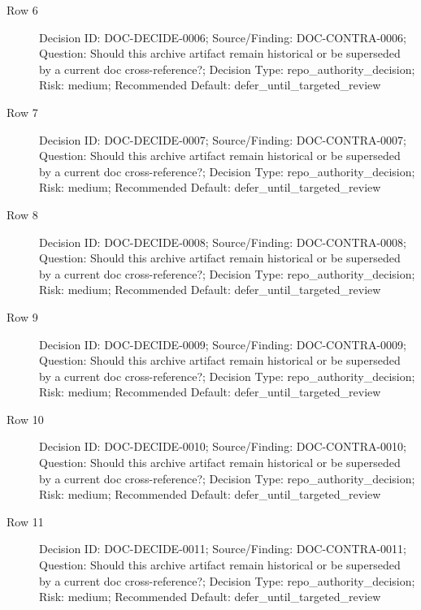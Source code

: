 \documentclass[9pt,a4paper,openany]{book}
\begin{document}
\begin{description}
\item[Row 6] Decision ID: DOC-\allowbreak{}DECIDE-\allowbreak{}0006; Source/\allowbreak{}Finding: DOC-\allowbreak{}CONTRA-\allowbreak{}0006; Question: Should this archive artifact remain historical or be superseded by a current doc cross-\allowbreak{}reference?; Decision Type: repo\_\allowbreak{}authority\_\allowbreak{}decision; Risk: medium; Recommended Default: defer\_\allowbreak{}until\_\allowbreak{}targeted\_\allowbreak{}review
\item[Row 7] Decision ID: DOC-\allowbreak{}DECIDE-\allowbreak{}0007; Source/\allowbreak{}Finding: DOC-\allowbreak{}CONTRA-\allowbreak{}0007; Question: Should this archive artifact remain historical or be superseded by a current doc cross-\allowbreak{}reference?; Decision Type: repo\_\allowbreak{}authority\_\allowbreak{}decision; Risk: medium; Recommended Default: defer\_\allowbreak{}until\_\allowbreak{}targeted\_\allowbreak{}review
\item[Row 8] Decision ID: DOC-\allowbreak{}DECIDE-\allowbreak{}0008; Source/\allowbreak{}Finding: DOC-\allowbreak{}CONTRA-\allowbreak{}0008; Question: Should this archive artifact remain historical or be superseded by a current doc cross-\allowbreak{}reference?; Decision Type: repo\_\allowbreak{}authority\_\allowbreak{}decision; Risk: medium; Recommended Default: defer\_\allowbreak{}until\_\allowbreak{}targeted\_\allowbreak{}review
\item[Row 9] Decision ID: DOC-\allowbreak{}DECIDE-\allowbreak{}0009; Source/\allowbreak{}Finding: DOC-\allowbreak{}CONTRA-\allowbreak{}0009; Question: Should this archive artifact remain historical or be superseded by a current doc cross-\allowbreak{}reference?; Decision Type: repo\_\allowbreak{}authority\_\allowbreak{}decision; Risk: medium; Recommended Default: defer\_\allowbreak{}until\_\allowbreak{}targeted\_\allowbreak{}review
\item[Row 10] Decision ID: DOC-\allowbreak{}DECIDE-\allowbreak{}0010; Source/\allowbreak{}Finding: DOC-\allowbreak{}CONTRA-\allowbreak{}0010; Question: Should this archive artifact remain historical or be superseded by a current doc cross-\allowbreak{}reference?; Decision Type: repo\_\allowbreak{}authority\_\allowbreak{}decision; Risk: medium; Recommended Default: defer\_\allowbreak{}until\_\allowbreak{}targeted\_\allowbreak{}review
\item[Row 11] Decision ID: DOC-\allowbreak{}DECIDE-\allowbreak{}0011; Source/\allowbreak{}Finding: DOC-\allowbreak{}CONTRA-\allowbreak{}0011; Question: Should this archive artifact remain historical or be superseded by a current doc cross-\allowbreak{}reference?; Decision Type: repo\_\allowbreak{}authority\_\allowbreak{}decision; Risk: medium; Recommended Default: defer\_\allowbreak{}until\_\allowbreak{}targeted\_\allowbreak{}review

\end{description}
\end{document}
